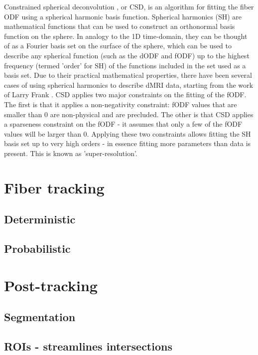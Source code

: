 \documentclass{bioinfo}
\begin{document}
Constrained spherical deconvolution \citep{tournier-calamante-etal:07}, or CSD, is an algorithm for fitting the fiber ODF using a spherical harmonic basis function. Spherical harmonics (SH) are mathematical functions that can be used to construct an orthonormal basis function on the sphere. In analogy to the 1D time-domain, they can be thought of as a Fourier basis set on the surface of the sphere, which can be used to describe any spherical function (such as the dODF and fODF) up to the highest frequency (termed 'order' for SH) of the functions included in the set used as a basis set. Due to their practical mathematical properties, there have been several cases of using spherical harmonics to describe dMRI data, starting from the work of Larry Frank \citep{Frank2001, Frank2002}. CSD applies two major constraints on the fitting of the fODF. The first is that it applies a non-negativity constraint: fODF values that are smaller than 0 are non-physical and are precluded. The other is that CSD applies a sparseness constraint on the fODF - it assumes that only a few of the fODF values will be larger than 0. Applying these two constraints allows fitting the SH basis set up to very high orders - in essence fitting more parameters than data is present. This is known as 'super-resolution'.
 

\section{Fiber tracking}

\subsection{Deterministic}

\subsection{Probabilistic}

\section{Post-tracking}

\subsection{Segmentation}

\subsection{ROIs - streamlines intersections}
\end{document}
